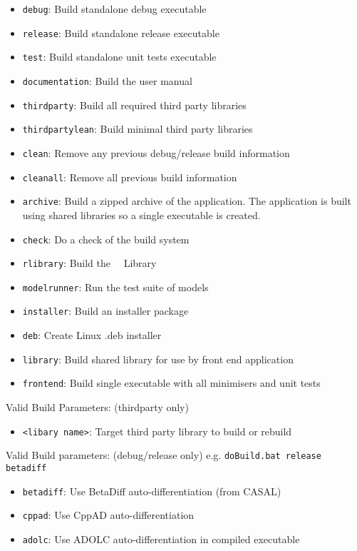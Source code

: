 \begin{itemize}
  \item \texttt{debug}:  Build standalone debug executable
  \item \texttt{release}: Build standalone release executable
  \item \texttt{test}: Build standalone unit tests executable
  \item \texttt{documentation}: Build the user manual
  \item \texttt{thirdparty}: Build all required third party libraries
  \item \texttt{thirdpartylean}: Build minimal third party libraries
  \item \texttt{clean}: Remove any previous debug/release build information
  \item \texttt{cleanall}: Remove all previous build information
  \item \texttt{archive}: Build a zipped archive of the application. The application is built using shared libraries so a single \CNAME executable is created.
  \item \texttt{check}: Do a check of the build system
  \item \texttt{rlibrary}: Build the \CNAME\ \R\ Library
  \item \texttt{modelrunner}: Run the test suite of models
  \item \texttt{installer}: Build an installer package
  \item \texttt{deb}: Create Linux .deb installer
  \item \texttt{library}: Build shared library for use by front end application
  \item \texttt{frontend}: Build single \CNAME executable with all minimisers and unit tests
\end{itemize}

Valid Build Parameters: (thirdparty only)
\begin{itemize}
  \item \texttt{<libary name>}: Target third party library to build or rebuild
\end{itemize}

Valid Build parameters: (debug/release only) e.g. \texttt{doBuild.bat release betadiff}
\begin{itemize}
  \item \texttt{betadiff}: Use BetaDiff auto-differentiation (from CASAL)
  \item \texttt{cppad}: Use CppAD auto-differentiation
  \item \texttt{adolc}: Use ADOLC auto-differentiation in compiled executable
\end{itemize}

